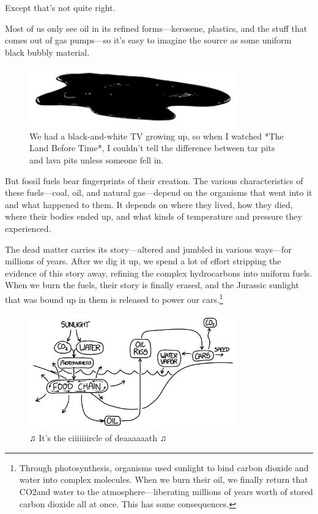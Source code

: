 {{Except that's not quite right.}

{Most of us only see oil in its refined forms—kerosene, plastics, and the stuff that comes out of gas pumps—so it's easy to imagine the source as some uniform black bubbly material.}

\begin{figure}[!htbp]
\centering
\includegraphics[scale=0.5, max width=0.8\textwidth]{imgs/a/101/bubbly.png}
\caption{We had a black-and-white TV growing up, so when I watched *The Land Before Time*, I couldn't tell the difference between tar pits and lava pits unless someone fell in.}
\end{figure}

{But fossil fuels bear fingerprints of their creation. The various characteristics of these fuels—coal, oil, and natural gas—depend on the organisms that went into it and what happened to them. It depends on where they lived, how they died, where their bodies ended up, and what kinds of temperature and pressure they experienced.}

{The dead matter carries its story—altered and jumbled in various ways—for millions of years. After we dig it up, we spend a lot of effort stripping the evidence of this story away, refining the complex hydrocarbons into uniform fuels. When we burn the fuels, their story is finally erased, and the Jurassic sunlight that was bound up in them is released to power our cars.{\footnote{Through photosynthesis, organisms used sunlight to bind carbon dioxide and water into complex molecules. When we burn their oil, we finally return that CO2and water to the atmosphere—liberating millions of years worth of stored carbon dioxide all at once. This has some consequences.} } }

\begin{figure}[!htbp]
\centering
\includegraphics[scale=0.5, max width=0.8\textwidth]{imgs/a/101/cycle.png}
\caption{♫ It's the ciiiiiiircle of deaaaaaath ♫}
\end{figure}

}
